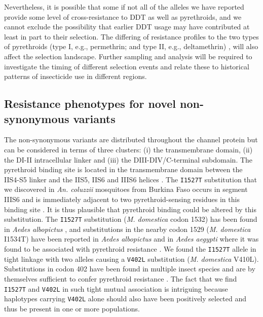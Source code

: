\documentclass[a4paper,11pt,abstracton,hidelinks]{scrartcl}
\begin{document}
%
Nevertheless, it is possible that some if not all of the alleles we have reported provide some level of cross-resistance to DDT as well as pyrethroids, and we cannot exclude the possibility that earlier DDT usage may have contributed at least in part to their selection.
%
The differing of resistance profiles to the two types of pyrethroids (type I, e.g., permethrin; and type II, e.g., deltamethrin) \cite{Hu2011}, will also affect the selection landscape.
%
Further sampling and analysis will be required to investigate the timing of different selection events and relate these to historical patterns of insecticide use in different regions.


\subsection*{Resistance phenotypes for novel non-synonymous variants}

%
The non-synonymous variants are distributed throughout the channel protein but can be considered in terms of three clusters: (i) the transmembrane domain, (ii) the DI-II intracellular linker and (iii) the DIII-DIV/C-terminal subdomain.
%
The pyrethroid binding site is located in the transmembrane domain between the IIS4-S5 linker and the IIS5, IIS6 and IIIS6 helices \cite{OReilly2006}.
%
The \texttt{I1527T} substitution that we discovered in \textit{An. coluzzii} mosquitoes from Burkina Faso occurs in segment IIIS6 and is immediately adjacent to two pyrethroid-sensing residues in this binding site \cite{Dong2014}.
%
It is thus plausible that pyrethroid binding could be altered by this substitution.
%
The \texttt{I1527T} substitution (\textit{M. domestica} codon 1532) has been found in \textit{Aedes albopictus} \cite{Xu2016}, and substitutions in the nearby codon 1529 (\textit{M. domestica} I1534T) have been reported in \textit{Aedes albopictus} and in \textit{Aedes aegypti} where it was found to be associated with pyrethroid resistance \cite{Dong2014, Ishak2015,Li2018}.
%
We found the \texttt{I1527T} allele in tight linkage with two alleles causing a \texttt{V402L} substitution (\textit{M. domestica} V410L).
%
Substitutions in codon 402 have been found in multiple insect species and are by themselves sufficient to confer pyrethroid resistance \cite{Dong2014}.
%
The fact that we find \texttt{I1527T} and \texttt{V402L} in such tight mutual association is intriguing because haplotypes carrying \texttt{V402L} alone should also have been positively selected and thus be present in one or more populations.
%
\end{document}
